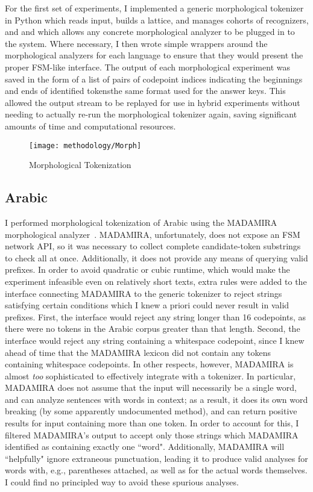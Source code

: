 For the first set of experiments, I implemented a generic morphological tokenizer in Python which reads input, builds a lattice, and manages cohorts of recognizers, and and which allows any concrete morphological analyzer to be plugged in to the system. Where necessary, I then wrote simple wrappers around the morphological analyzers for each language to ensure that they would present the proper FSM-like interface.
The output of each morphological experiment was saved in the form of a list of pairs of codepoint indices indicating the beginnings and ends of identified tokens\textemdash the same format used for the answer keys. This allowed the output stream to be replayed for use in hybrid experiments without needing to actually re-run the morphological tokenizer again, saving significant amounts of time and computational resources.

\begin{figure}
	\texttt{[image: methodology/Morph]}
	\caption{Morphological Tokenization}
	\label{morphdiagram}
\end{figure}

\subsection{Arabic}
I performed morphological tokenization of Arabic using the MADAMIRA morphological analyzer~\cite{pasha14}. MADAMIRA, unfortunately, does not expose an FSM network API, so it was necessary to collect complete candidate-token substrings to check all at once. Additionally, it does not provide any means of querying valid prefixes. In order to avoid quadratic or cubic runtime, which would make the experiment infeasible even on relatively short texts, extra rules were added to the interface connecting MADAMIRA to the generic tokenizer to reject strings satisfying certain conditions which I knew a priori could never result in valid prefixes. First, the interface would reject any string longer than 16 codepoints, as there were no tokens in the Arabic corpus greater than that length. Second, the interface would reject any string containing a whitespace codepoint, since I knew ahead of time that the MADAMIRA lexicon did not contain any tokens containing whitespace codepoints.
In other respects, however, MADAMIRA is almost \textit{too} sophisticated to effectively integrate with a tokenizer. In particular, MADAMIRA does not assume that the input will necessarily be a single word, and can analyze sentences with words in context; as a result, it does its own word breaking (by some apparently undocumented method), and can return positive results for input containing more than one token. In order to account for this, I filtered MADAMIRA's output to accept only those strings which MADAMIRA identified as containing exactly one ``word". Additionally, MADAMIRA will ``helpfully" ignore extraneous punctuation, leading it to produce valid analyses for words with, e.g., parentheses attached, as well as for the actual words themselves. I could find no principled way to avoid these spurious analyses.

